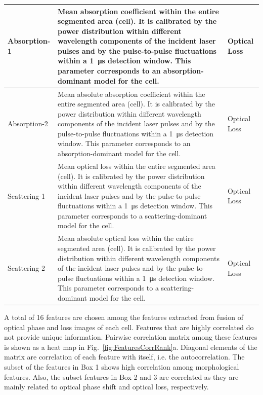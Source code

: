 \documentclass[aps,pra,reprint,superscriptaddress]{revtex4-1}
\begin{document}
\begin{table}[hb!]
\begin{tabular}{|p{}|p{}|p{}|}
Absorption-1	 &Mean absorption coefficient within the entire segmented area (cell). It is calibrated by the power distribution within different wavelength components of the incident laser pulses and by the pulse-to-pulse fluctuations within a \SI{1}{\micro\second} detection window. This parameter corresponds to an absorption-dominant model for the cell.	 &Optical Loss\\ \hline
Absorption-2	 &Mean absolute absorption coefficient within the entire segmented area (cell). It is calibrated by the power distribution within different wavelength components of the incident laser pulses and by the pulse-to-pulse fluctuations within a \SI{1}{\micro\second} detection window. This parameter corresponds to an absorption-dominant model for the cell.	 &Optical Loss\\ \hline
Scattering-1	 &Mean optical loss within the entire segmented area (cell). It is calibrated by the power distribution within different wavelength components of the incident laser pulses and by the pulse-to-pulse fluctuations within a \SI{1}{\micro\second} detection window. This parameter corresponds to a scattering-dominant model for the cell.	 &Optical Loss\\ \hline
Scattering-2	 &Mean absolute optical loss within the entire segmented area (cell). It is calibrated by the power distribution within different wavelength components of the incident laser pulses and by the pulse-to-pulse fluctuations within a \SI{1}{\micro\second} detection window. This parameter corresponds to a scattering-dominant model for the cell.	 &Optical Loss\\
\hline
\end{tabular}
\end{table}

A total of 16 features are chosen among the features extracted from fusion of optical phase and loss images of each cell. Features that are highly correlated do not provide unique information. Pairwise correlation matrix among these features is shown as a heat map in Fig.~\ref{fig:FeaturesCorrRank}a. Diagonal elements of the matrix are correlation of each feature with itself, i.e. the autocorrelation. The subset of the features in Box 1 shows high correlation among morphological features. Also, the subset features in Box 2 and 3 are correlated as they are mainly related to optical phase shift and optical loss, respectively. 
\end{document}
